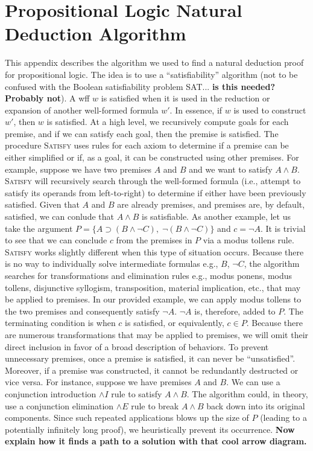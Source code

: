 \documentclass[ms]{uncgdissertationexp2}
\theoremstyle{plain}
\theoremstyle{definition}
\theoremstyle{remark}
\begin{document}
\chapter{Propositional Logic Natural Deduction Algorithm}

This appendix describes the algorithm we used to find a natural deduction proof for propositional logic. The idea is to use a ``satisfiability'' algorithm (not to be confused with the Boolean satisfiability problem SAT... \textbf{is this needed? Probably not}). A wff $w$ is satisfied when it is used in the reduction or expansion of another well-formed formula $w'$. In essence, if $w$ is used to construct $w'$, then $w$ is satisfied. At a high level, we recursively compute goals for each premise, and if we can satisfy each goal, then the premise is satisfied. The procedure \textsc{Satisfy} uses rules for each axiom to determine if a premise can be either simplified or if, as a goal, it can be constructed using other premises. For example, suppose we have two premises $A$ and $B$ and we want to satisfy $A \land B$. \textsc{Satisfy} will recursively search through the well-formed formula (i.e., attempt to satisfy its operands from left-to-right) to determine if either have been previously satisfied. Given that $A$ and $B$ are already premises, and premises are, by default, satisfied, we can conlude that $A \land B$ is satisfiable. As another example, let us take the argument $P = \{A \supset (B \land \lnot C),\;\lnot (B \land \lnot C)\}$ and $c = \lnot A$. It is trivial to see that we can conclude $c$ from the premises in $P$ via a modus tollens rule. \textsc{Satisfy} works slightly different when this type of situation occurs. Because there is no way to individually solve intermediate formulas e.g., $B$, $\lnot C$, the algorithm searches for transformations and elimination rules e.g., modus ponens, modus tollens, disjunctive syllogism, transposition, material implication, etc., that may be applied to premises. In our provided example, we can apply modus tollens to the two premises and consequently satisfy $\lnot{A}$. $\lnot{A}$ is, therefore, added to $P$. The terminating condition is when $c$ is satisfied, or equivalently, $c \in P$. Because there are numerous transformations that may be applied to premises, we will omit their direct inclusion in favor of a broad description of behaviors. To prevent unnecessary premises, once a premise is satisfied, it can never be ``unsatisfied''. Moreover, if a premise was constructed, it cannot be redundantly destructed or vice versa. For instance, suppose we have premises $A$ and $B$. We can use a conjunction introduction $\land{I}$ rule to satisfy $A \land B$. The algorithm could, in theory, use a conjunction elimination $\land{E}$ rule to break $A \land B$ back down into its original components. Since such repeated applications blows up the size of $P$ (leading to a potentially infinitely long proof), we heuristically prevent its occurrence. \textbf{Now explain how it finds a path to a solution with that cool arrow diagram.}
\end{document}
